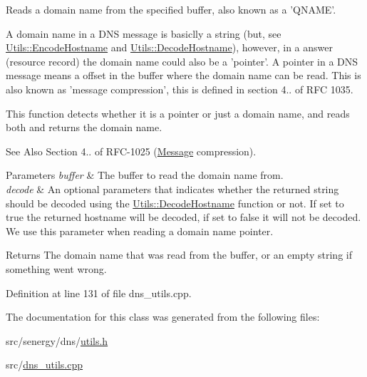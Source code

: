 Reads a domain name from the specified buffer, also known as a 'Q\-N\-A\-M\-E'. 

A domain name in a D\-N\-S message is basiclly a string (but, see \hyperlink{class_senergy_1_1_dns_1_1_utils_a68f1ebf9810ecb225a4f73c4200778bf}{Utils\-::\-Encode\-Hostname} and \hyperlink{class_senergy_1_1_dns_1_1_utils_ad621e66ca0463aaa21c9b74b489f09f3}{Utils\-::\-Decode\-Hostname}), however, in a answer (resource record) the domain name could also be a 'pointer'. A pointer in a D\-N\-S message means a offset in the buffer where the domain name can be read. This is also known as 'message compression', this is defined in section 4.. of R\-F\-C 1035.

This function detects whether it is a pointer or just a domain name, and reads both and returns the domain name.

\begin{DoxySeeAlso}{See Also}
Section 4.. of R\-F\-C-\/1025 (\hyperlink{class_senergy_1_1_dns_1_1_message}{Message} compression).
\end{DoxySeeAlso}

\begin{DoxyParams}{Parameters}
{\em buffer} & The buffer to read the domain name from. \\
\hline
{\em decode} & An optional parameters that indicates whether the returned string should be decoded using the \hyperlink{class_senergy_1_1_dns_1_1_utils_ad621e66ca0463aaa21c9b74b489f09f3}{Utils\-::\-Decode\-Hostname} function or not. If set to true the returned hostname will be decoded, if set to false it will not be decoded. We use this parameter when reading a domain name pointer.\\
\hline
\end{DoxyParams}
\begin{DoxyReturn}{Returns}
The domain name that was read from the buffer, or an empty string if something went wrong. 
\end{DoxyReturn}


Definition at line 131 of file dns\-\_\-utils.\-cpp.



The documentation for this class was generated from the following files\-:\begin{DoxyCompactItemize}
\item 
src/senergy/dns/\hyperlink{utils_8h}{utils.\-h}\item 
src/\hyperlink{dns__utils_8cpp}{dns\-\_\-utils.\-cpp}\end{DoxyCompactItemize}

